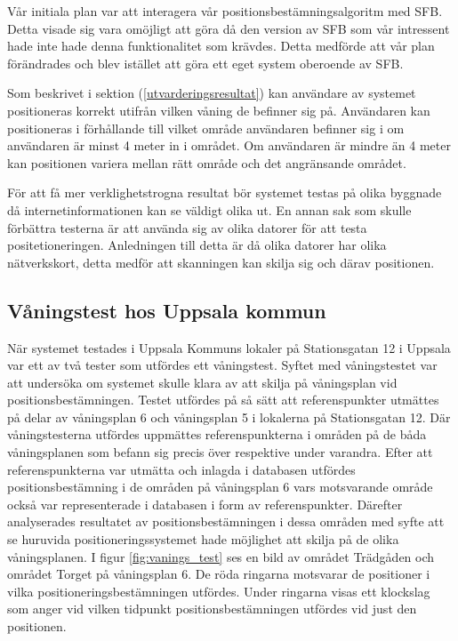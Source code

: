 \documentclass[swedish, a4paper,12pt]{article}
\begin{document}
Vår initiala plan var att interagera vår positionsbestämningsalgoritm med SFB. Detta visade sig vara omöjligt att göra då den version av SFB som vår intressent hade inte hade denna funktionalitet som krävdes. Detta medförde att vår plan förändrades och blev istället att göra ett eget system oberoende av SFB.
\fi

Som beskrivet i sektion (\ref{utvarderingsresultat}) kan användare av systemet positioneras korrekt utifrån vilken våning de befinner sig på. Användaren kan positioneras i förhållande till vilket område användaren befinner sig i om användaren är minst 4 meter in i området. Om användaren är mindre än 4 meter kan positionen variera mellan rätt område och det angränsande området.

För att få mer verklighetstrogna resultat bör systemet testas på olika byggnade då internetinformationen kan se väldigt olika ut. En annan sak som skulle förbättra testerna är att använda sig av olika datorer för att testa positetioneringen. Anledningen till detta är då olika datorer har olika nätverkskort, detta medför att skanningen kan skilja sig och därav positionen.

\subsection{Våningstest hos Uppsala kommun}
När systemet testades i Uppsala Kommuns lokaler på Stationsgatan 12 i Uppsala var ett av två tester som utfördes ett våningstest. Syftet med våningstestet var att undersöka om systemet skulle klara av att skilja på våningsplan vid positionsbestämningen. Testet utfördes på så sätt att referenspunkter utmättes på delar av våningsplan 6 och våningsplan 5 i lokalerna på Stationsgatan 12. Där våningstesterna utfördes uppmättes referenspunkterna i områden på de båda våningsplanen som befann sig precis över respektive under varandra. Efter att referenspunkterna var utmätta och inlagda i databasen utfördes positionsbestämning i de områden på våningsplan 6 vars motsvarande område också var representerade i databasen i form av referenspunkter. Därefter analyserades resultatet av positionsbestämningen i dessa områden med syfte att se huruvida positioneringssystemet hade möjlighet att skilja på de olika våningsplanen. I figur \ref{fig:vanings_test} ses en bild av området Trädgåden och området Torget på våningsplan 6. De röda ringarna motsvarar de positioner i vilka positioneringsbestämningen utfördes. Under ringarna visas ett klockslag som anger vid vilken tidpunkt positionsbestämningen utfördes vid just den positionen.    
\end{document}
